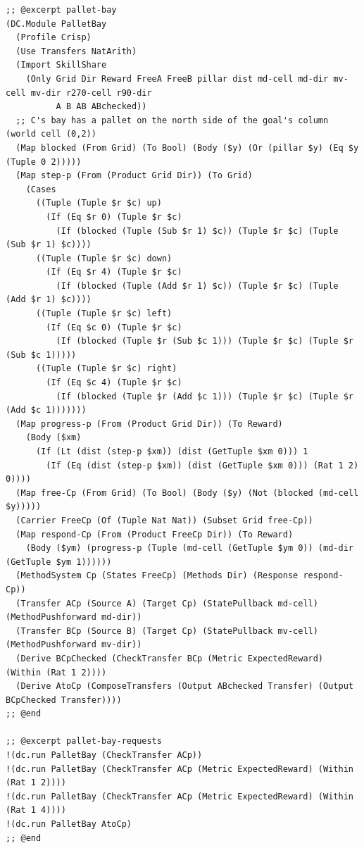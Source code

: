 \documentclass[11pt]{article}
\theoremstyle{definition}
\theoremstyle{plain}
\begin{document}
\begin{lstlisting}[style=mettafull]
;; @excerpt pallet-bay
(DC.Module PalletBay
  (Profile Crisp)
  (Use Transfers NatArith)
  (Import SkillShare
    (Only Grid Dir Reward FreeA FreeB pillar dist md-cell md-dir mv-cell mv-dir r270-cell r90-dir
          A B AB ABchecked))
  ;; C's bay has a pallet on the north side of the goal's column (world cell (0,2))
  (Map blocked (From Grid) (To Bool) (Body ($y) (Or (pillar $y) (Eq $y (Tuple 0 2)))))
  (Map step-p (From (Product Grid Dir)) (To Grid)
    (Cases
      ((Tuple (Tuple $r $c) up)
        (If (Eq $r 0) (Tuple $r $c)
          (If (blocked (Tuple (Sub $r 1) $c)) (Tuple $r $c) (Tuple (Sub $r 1) $c))))
      ((Tuple (Tuple $r $c) down)
        (If (Eq $r 4) (Tuple $r $c)
          (If (blocked (Tuple (Add $r 1) $c)) (Tuple $r $c) (Tuple (Add $r 1) $c))))
      ((Tuple (Tuple $r $c) left)
        (If (Eq $c 0) (Tuple $r $c)
          (If (blocked (Tuple $r (Sub $c 1))) (Tuple $r $c) (Tuple $r (Sub $c 1)))))
      ((Tuple (Tuple $r $c) right)
        (If (Eq $c 4) (Tuple $r $c)
          (If (blocked (Tuple $r (Add $c 1))) (Tuple $r $c) (Tuple $r (Add $c 1)))))))
  (Map progress-p (From (Product Grid Dir)) (To Reward)
    (Body ($xm)
      (If (Lt (dist (step-p $xm)) (dist (GetTuple $xm 0))) 1
        (If (Eq (dist (step-p $xm)) (dist (GetTuple $xm 0))) (Rat 1 2) 0))))
  (Map free-Cp (From Grid) (To Bool) (Body ($y) (Not (blocked (md-cell $y)))))
  (Carrier FreeCp (Of (Tuple Nat Nat)) (Subset Grid free-Cp))
  (Map respond-Cp (From (Product FreeCp Dir)) (To Reward)
    (Body ($ym) (progress-p (Tuple (md-cell (GetTuple $ym 0)) (md-dir (GetTuple $ym 1))))))
  (MethodSystem Cp (States FreeCp) (Methods Dir) (Response respond-Cp))
  (Transfer ACp (Source A) (Target Cp) (StatePullback md-cell) (MethodPushforward md-dir))
  (Transfer BCp (Source B) (Target Cp) (StatePullback mv-cell) (MethodPushforward mv-dir))
  (Derive BCpChecked (CheckTransfer BCp (Metric ExpectedReward) (Within (Rat 1 2))))
  (Derive AtoCp (ComposeTransfers (Output ABchecked Transfer) (Output BCpChecked Transfer))))
;; @end

;; @excerpt pallet-bay-requests
!(dc.run PalletBay (CheckTransfer ACp))
!(dc.run PalletBay (CheckTransfer ACp (Metric ExpectedReward) (Within (Rat 1 2))))
!(dc.run PalletBay (CheckTransfer ACp (Metric ExpectedReward) (Within (Rat 1 4))))
!(dc.run PalletBay AtoCp)
;; @end
\end{lstlisting}
\end{document}
